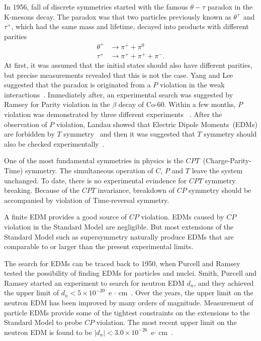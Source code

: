 In 1956, fall of discrete symmetries started with the famous
$\theta-\tau$ paradox in the K-mesons decay. The paradox was that two
particles previously known as $\theta^+$ and $\tau^+$, which had the
same mass and lifetime, decayed into products with different parities
\begin{equation}
  \begin{split}
    \theta^+ &\rightarrow \pi^+ + \pi^0 \\
    \tau^+ &\rightarrow \pi^+ + \pi^+ + \pi^-.
  \end{split}
\end{equation}
At first, it was assumed that the initial states should also have
different parities, but precise measurements revealed that this is not
the case. Yang and Lee suggested that the paradox is originated from a
$P$ violation in the weak
interactions~\cite{lee1957parity}. Immediately after, an experimental
search was suggested by Ramsey for Parity violation in the $\beta$
decay of Co-60. Within a few months, $P$ violation was demonstrated by
three different experiments
~\cite{PhysRev.105.1413,PhysRev.105.1415,friedman1957nuclear}. After
the observation of $P$ violation, Landau showed that Electric Dipole
Moments~(EDMs) are forbidden by $T$
symmetry~\cite{landau1957conservation} and then it was suggested that
$T$ symmetry should also be checked
experimentally~\cite{PhysRev.106.517}.

One of the most fundamental symmetries in physics is the
$CPT$~(Charge-Parity-Time) symmetry. The simultaneous operation of
$C$, $P$ and $T$ leave the system unchanged. To date, there is no
experimental evindence for $CPT$ symmetry breaking.  Because of the
$CPT$ invariance, breakdown of $CP$ symmetry should be accompanied by
violation of Time-reversal symmetry. 

A finite EDM provides a good source of $CP$ violation. EDMs caused by
$CP$ violation in the Standard Model are negligible. But most
extensions of the Standard Model such as supersymmetry naturally
produce EDMs that are comparable to or larger than the present
experimental limits.

The search for EDMs can be traced back to 1950, when Purcell and
Ramsey tested the possibility of finding EDMs for particles and
nuclei. Smith, Purcell and Ramsey started an experiment to search for
neutron EDM $d_n$, and they achieved the upper limit of
$d_n < 5 \times 10^{-20}$~e $\cdot$ cm~\cite{smith1957experimental}.
Over the years, the upper limit on the neutron EDM has been improved
by many orders of magnitude. Measurement of particle EDMs provide some
of the tightest constraints on the extensions to the Standard Model to
probe $CP$ violation. The most recent upper limit on the neutron EDM
is found to be $\vert d_n\vert < 3.0 \times 10^{-26} $~e$\cdot$
cm~\cite{pendlebury2015revised}.



